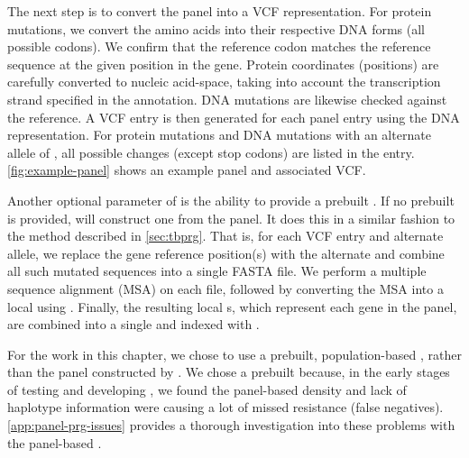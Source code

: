 The next step is to convert the panel into a VCF representation. For protein mutations, we convert the amino acids into their respective DNA forms (all possible codons). We confirm that the reference codon matches the reference sequence at the given position in the gene. Protein coordinates (positions) are carefully converted to nucleic acid-space, taking into account the transcription strand specified in the annotation. DNA mutations are likewise checked against the reference. A VCF entry is then generated for each panel entry using the DNA representation. For protein mutations and DNA mutations with an alternate allele of , all possible changes (except stop codons) are listed in the entry. \autoref{fig:example-panel} shows an example panel and associated VCF.

Another optional parameter of \drprg{}  is the ability to provide a prebuilt \prg{}. If no prebuilt \prg{} is provided, \drprg{} will construct one from the panel. It does this in a similar fashion to the method described in \autoref{sec:tbprg}. That is, for each VCF entry and alternate allele, we replace the gene reference position(s) with the alternate and combine all such mutated sequences into a single FASTA file. We perform a multiple sequence alignment (MSA) on each file, followed by converting the MSA into a local \prg{} using \makeprg{}. Finally, the resulting local \prg{}s, which represent each gene in the panel, are combined into a single \prg{} and indexed with \pandora{}.

For the work in this chapter, we chose to use a prebuilt, population-based \prg{}, rather than the panel \prg{} constructed by \drprg{}. We chose a prebuilt \prg{} because, in the early stages of testing and developing \drprg{}, we found the panel-based \prg{} density and lack of haplotype information were causing a lot of missed resistance (false negatives). \autoref{app:panel-prg-issues} provides a thorough investigation into these problems with the panel-based \prg{}.

